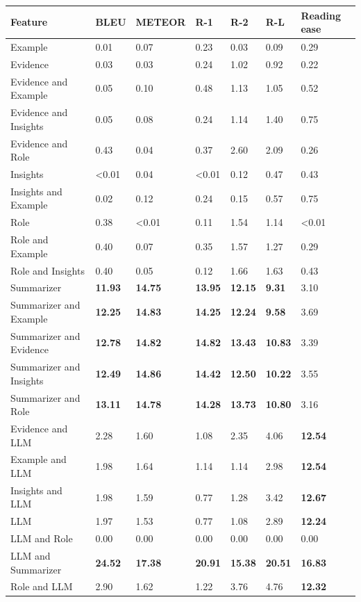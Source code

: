 \begin{tabular}{|l|l|l|l|l|l|l|}
\hline
\textbf{Feature} & BLEU & METEOR & R-1 & R-2 & R-L & Reading ease \\
 \hline
 Example & 0.01 & 0.07 & 0.23 & 0.03 & 0.09 & 0.29 \\
 \hline
 Evidence & 0.03 & 0.03 & 0.24 & 1.02 & 0.92 & 0.22 \\
 \hline
 Evidence and Example & 0.05 & 0.10 & 0.48 & 1.13 & 1.05 & 0.52 \\
 \hline
 Evidence and Insights & 0.05 & 0.08 & 0.24 & 1.14 & 1.40 & 0.75 \\
 \hline
 Evidence and Role & 0.43 & 0.04 & 0.37 & 2.60 & 2.09 & 0.26 \\
 \hline
 Insights & \textless{}0.01 & 0.04 & \textless{}0.01 & 0.12 & 0.47 & 0.43 \\
 \hline
 Insights and Example & 0.02 & 0.12 & 0.24 & 0.15 & 0.57 & 0.75 \\
 \hline
 Role & 0.38 & \textless{}0.01 & 0.11 & 1.54 & 1.14 & \textless{}0.01 \\
 \hline
 Role and Example & 0.40 & 0.07 & 0.35 & 1.57 & 1.27 & 0.29 \\
 \hline
 Role and Insights & 0.40 & 0.05 & 0.12 & 1.66 & 1.63 & 0.43 \\
 \hline
 Summarizer & \textbf{11.93} & \textbf{14.75} & \textbf{13.95} & \textbf{12.15} & \textbf{9.31} & 3.10 \\
 \hline
 Summarizer and Example & \textbf{12.25} & \textbf{14.83} & \textbf{14.25} & \textbf{12.24} & \textbf{9.58} & 3.69 \\
 \hline
 Summarizer and Evidence & \textbf{12.78} & \textbf{14.82} & \textbf{14.82} & \textbf{13.43} & \textbf{10.83} & 3.39 \\
 \hline
 Summarizer and Insights & \textbf{12.49} & \textbf{14.86} & \textbf{14.42} & \textbf{12.50} & \textbf{10.22} & 3.55 \\
 \hline
 Summarizer and Role & \textbf{13.11} & \textbf{14.78} & \textbf{14.28} & \textbf{13.73} & \textbf{10.80} & 3.16 \\
 \hline
 Evidence and LLM & 2.28 & 1.60 & 1.08 & 2.35 & 4.06 & \textbf{12.54} \\
 \hline
 Example and LLM & 1.98 & 1.64 & 1.14 & 1.14 & 2.98 & \textbf{12.54} \\
 \hline
 Insights and LLM & 1.98 & 1.59 & 0.77 & 1.28 & 3.42 & \textbf{12.67} \\
 \hline
 LLM & 1.97 & 1.53 & 0.77 & 1.08 & 2.89 & \textbf{12.24} \\
 \hline
 LLM and Role & 0.00 & 0.00 & 0.00 & 0.00 & 0.00 & 0.00 \\
 \hline
 LLM and Summarizer & \textbf{24.52} & \textbf{17.38} & \textbf{20.91} & \textbf{15.38} & \textbf{20.51} & \textbf{16.83} \\
 \hline
 Role and LLM & 2.90 & 1.62 & 1.22 & 3.76 & 4.76 & \textbf{12.32} \\
\hline
\end{tabular}
